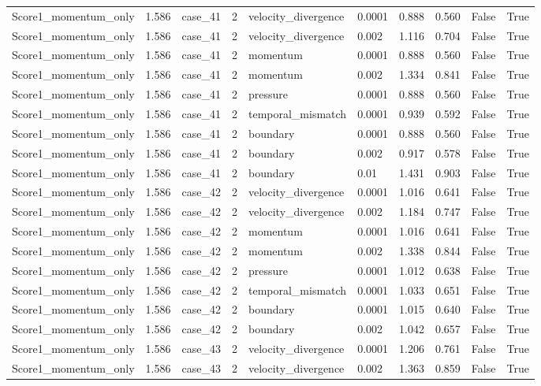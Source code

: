 \begin{longtable}{llllllllll}
Score1\_momentum\_only & 1.586 & case\_41 & 2 & velocity\_divergence & 0.0001 & 0.888 & 0.560 & False & True \\
Score1\_momentum\_only & 1.586 & case\_41 & 2 & velocity\_divergence & 0.002 & 1.116 & 0.704 & False & True \\
Score1\_momentum\_only & 1.586 & case\_41 & 2 & momentum & 0.0001 & 0.888 & 0.560 & False & True \\
Score1\_momentum\_only & 1.586 & case\_41 & 2 & momentum & 0.002 & 1.334 & 0.841 & False & True \\
Score1\_momentum\_only & 1.586 & case\_41 & 2 & pressure & 0.0001 & 0.888 & 0.560 & False & True \\
Score1\_momentum\_only & 1.586 & case\_41 & 2 & temporal\_mismatch & 0.0001 & 0.939 & 0.592 & False & True \\
Score1\_momentum\_only & 1.586 & case\_41 & 2 & boundary & 0.0001 & 0.888 & 0.560 & False & True \\
Score1\_momentum\_only & 1.586 & case\_41 & 2 & boundary & 0.002 & 0.917 & 0.578 & False & True \\
Score1\_momentum\_only & 1.586 & case\_41 & 2 & boundary & 0.01 & 1.431 & 0.903 & False & True \\
Score1\_momentum\_only & 1.586 & case\_42 & 2 & velocity\_divergence & 0.0001 & 1.016 & 0.641 & False & True \\
Score1\_momentum\_only & 1.586 & case\_42 & 2 & velocity\_divergence & 0.002 & 1.184 & 0.747 & False & True \\
Score1\_momentum\_only & 1.586 & case\_42 & 2 & momentum & 0.0001 & 1.016 & 0.641 & False & True \\
Score1\_momentum\_only & 1.586 & case\_42 & 2 & momentum & 0.002 & 1.338 & 0.844 & False & True \\
Score1\_momentum\_only & 1.586 & case\_42 & 2 & pressure & 0.0001 & 1.012 & 0.638 & False & True \\
Score1\_momentum\_only & 1.586 & case\_42 & 2 & temporal\_mismatch & 0.0001 & 1.033 & 0.651 & False & True \\
Score1\_momentum\_only & 1.586 & case\_42 & 2 & boundary & 0.0001 & 1.015 & 0.640 & False & True \\
Score1\_momentum\_only & 1.586 & case\_42 & 2 & boundary & 0.002 & 1.042 & 0.657 & False & True \\
Score1\_momentum\_only & 1.586 & case\_43 & 2 & velocity\_divergence & 0.0001 & 1.206 & 0.761 & False & True \\
Score1\_momentum\_only & 1.586 & case\_43 & 2 & velocity\_divergence & 0.002 & 1.363 & 0.859 & False & True \\

\end{longtable}
